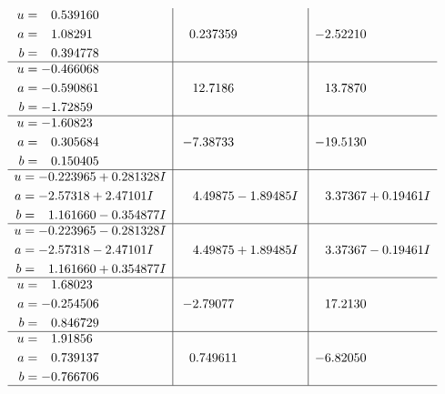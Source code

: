 \documentclass[1p]{elsarticle_modified}
\theoremstyle{definition}
\begin{document}
$$\begin{array}{c|c|c}
\begin{aligned}
u &= \phantom{-}0.539160\phantom{ +0.000000I} \\
a &= \phantom{-}1.08291\phantom{ +0.000000I} \\
b &= \phantom{-}0.394778\phantom{ +0.000000I}\end{aligned}
 & \phantom{-}0.237359\phantom{ +0.000000I} & -2.52210\phantom{ +0.000000I} \\ \hline\begin{aligned}
u &= -0.466068\phantom{ +0.000000I} \\
a &= -0.590861\phantom{ +0.000000I} \\
b &= -1.72859\phantom{ +0.000000I}\end{aligned}
 & \phantom{-}12.7186\phantom{ +0.000000I} & \phantom{-}13.7870\phantom{ +0.000000I} \\ \hline\begin{aligned}
u &= -1.60823\phantom{ +0.000000I} \\
a &= \phantom{-}0.305684\phantom{ +0.000000I} \\
b &= \phantom{-}0.150405\phantom{ +0.000000I}\end{aligned}
 & -7.38733\phantom{ +0.000000I} & -19.5130\phantom{ +0.000000I} \\ \hline\begin{aligned}
u &= -0.223965 + 0.281328 I \\
a &= -2.57318 + 2.47101 I \\
b &= \phantom{-}1.161660 - 0.354877 I\end{aligned}
 & \phantom{-}4.49875 - 1.89485 I & \phantom{-}3.37367 + 0.19461 I \\ \hline\begin{aligned}
u &= -0.223965 - 0.281328 I \\
a &= -2.57318 - 2.47101 I \\
b &= \phantom{-}1.161660 + 0.354877 I\end{aligned}
 & \phantom{-}4.49875 + 1.89485 I & \phantom{-}3.37367 - 0.19461 I \\ \hline\begin{aligned}
u &= \phantom{-}1.68023\phantom{ +0.000000I} \\
a &= -0.254506\phantom{ +0.000000I} \\
b &= \phantom{-}0.846729\phantom{ +0.000000I}\end{aligned}
 & -2.79077\phantom{ +0.000000I} & \phantom{-}17.2130\phantom{ +0.000000I} \\ \hline\begin{aligned}
u &= \phantom{-}1.91856\phantom{ +0.000000I} \\
a &= \phantom{-}0.739137\phantom{ +0.000000I} \\
b &= -0.766706\phantom{ +0.000000I}\end{aligned}
 & \phantom{-}0.749611\phantom{ +0.000000I} & -6.82050\phantom{ +0.000000I}\\
 \hline 
 \end{array}$$\newpage\newpage\renewcommand{\arraystretch}{1}
\end{document}
